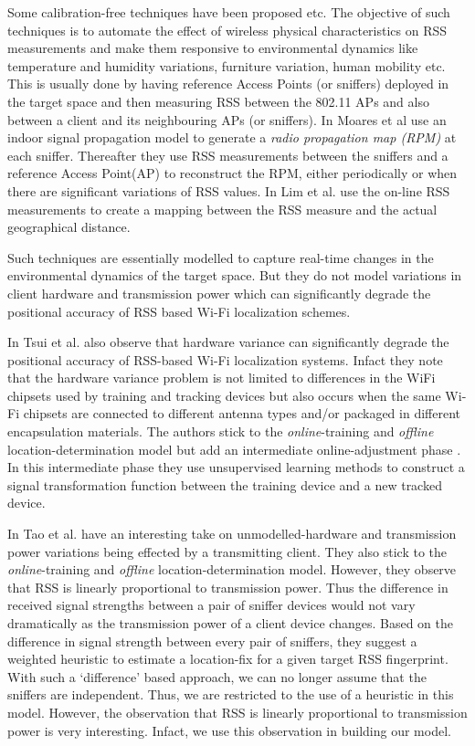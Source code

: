 \documentclass{Localization-PaperWriteupDraft}
\begin{document}
Some calibration-free techniques have been proposed \cite{Moraes:2006:CWL:1164783.1164799}
\cite{Gwon:2004:ECC:1023783.1023786} \cite{Lim:2010:ZIL:1741400.1741464} etc. The objective of such techniques is
to automate the effect of wireless physical characteristics on RSS
measurements and make them responsive to environmental dynamics like
temperature and humidity variations, furniture variation, human mobility
etc. This is usually done by having reference Access Points (or
sniffers) deployed in the target space and then measuring RSS between
the 802.11 APs and also between a client and its neighbouring APs (or
sniffers). In \cite{Moraes:2006:CWL:1164783.1164799} Moares et al use an indoor signal propagation model to generate a 
{\it radio propagation map (RPM)} at each sniffer. Thereafter they use
RSS measurements between the sniffers and a reference Access Point(AP)
to reconstruct the RPM, either periodically or when there are
significant variations of RSS values. In \cite{Lim:2010:ZIL:1741400.1741464} Lim et al. use
the on-line RSS measurements to create a mapping between the RSS measure
and the actual geographical distance.

Such techniques are essentially modelled to capture real-time changes in
the environmental dynamics of the target space. But they do not model variations in client
hardware and transmission power which can significantly degrade the
positional accuracy of RSS based Wi-Fi localization schemes.

In \cite{Tsui:2009:ULS:1741410.1741596} Tsui et al. also observe that hardware variance can
significantly degrade the positional accuracy of RSS-based Wi-Fi
localization systems. Infact they note that the hardware variance
problem is not limited to differences in the WiFi chipsets used by
training and tracking devices but also occurs when the same Wi-Fi
chipsets are connected to different antenna types and/or packaged in
different encapsulation materials. The authors stick to the
{\it online}-training and {\it offline} location-determination model
but add an intermediate online-adjustment phase . In this intermediate
phase they use unsupervised learning methods to construct a signal
transformation function between the training device and a new tracked
device.

In \cite{Tao:2003:WLL:941311.941314} Tao et al. have an interesting take on unmodelled-hardware and
transmission power variations being effected by a transmitting client.
They also stick to the {\it online}-training and {\it offline}
location-determination model. However, they observe that RSS is linearly proportional to transmission power.
Thus the difference in received signal strengths between a pair of
sniffer devices would not vary dramatically as the transmission power
of a client device changes. Based on the difference in signal strength between every pair
of sniffers, they suggest a weighted heuristic to estimate a
location-fix for a given target RSS fingerprint. With such a
`difference' based approach, we can no longer assume that the sniffers
are independent. Thus, we are restricted to the use of a heuristic in
this model. However, the observation that RSS is linearly proportional to transmission power
is very interesting. Infact, we use this observation in building our
model.
\end{document}
